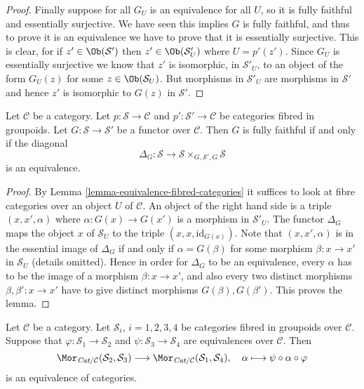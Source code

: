 \begin{proof}
\medskip\noindent
Finally suppose for all $G_U$ is an equivalence for all $U$, so it is
fully faithful and essentially surjective.  We have seen this implies $G$ is
fully faithful, and thus to prove it is an equivalence we have to prove that
it is essentially surjective.  This is clear, for if $z'\in
\Ob(\mathcal{S}')$ then $z'\in \Ob(\mathcal{S}'_U)$ where
$U = p'(z')$.  Since $G_U$ is essentially surjective we know that
$z'$ is isomorphic, in $\mathcal{S}'_U$, to an object of the form
$G_U(z)$ for some $z\in \Ob(\mathcal{S}_U)$.  But morphisms
in $\mathcal{S}'_U$ are morphisms in $\mathcal{S}'$ and hence $z'$ is
isomorphic to $G(z)$ in $\mathcal{S}'$.
\end{proof}

\begin{lemma}
\label{lemma-fully-faithful-diagonal-equivalence}
Let $\mathcal{C}$ be a category. Let $p : \mathcal{S}\to \mathcal{C}$ and
$p' : \mathcal{S'}\to \mathcal{C}$ be categories fibred in groupoids.
Let $G : \mathcal{S}\to \mathcal {S}'$ be a functor over $\mathcal{C}$.
Then $G$ is fully faithful if and only if the diagonal
$$
\Delta_G :
\mathcal{S}
\longrightarrow
\mathcal{S} \times_{G, \mathcal{S}', G} \mathcal{S}
$$
is an equivalence.
\end{lemma}

\begin{proof}
By
Lemma \ref{lemma-equivalence-fibred-categories}
it suffices to look at fibre categories over an object $U$ of $\mathcal{C}$.
An object of the right hand side is a triple $(x, x', \alpha)$ where
$\alpha : G(x) \to G(x')$ is a morphism in $\mathcal{S}'_U$.
The functor $\Delta_G$ maps the object $x$ of $\mathcal{S}_U$
to the triple $(x, x, \text{id}_{G(x)})$. Note that $(x, x', \alpha)$
is in the essential image of $\Delta_G$ if and only if $\alpha = G(\beta)$
for some morphism $\beta : x \to x'$ in $\mathcal{S}_U$ (details omitted).
Hence in order for $\Delta_G$ to be an equivalence, every $\alpha$ has to
be the image of a morphism $\beta : x \to x'$, and also every two
distinct morphisms $\beta, \beta' : x \to x'$ have to give distinct
morphisms $G(\beta), G(\beta')$. This proves the lemma.
\end{proof}

\begin{lemma}
\label{lemma-morphisms-equivalent-fibred-groupoids}
Let $\mathcal{C}$ be a category.
Let $\mathcal{S}_i$, $i = 1, 2, 3, 4$ be categories fibred in
groupoids over $\mathcal{C}$.
Suppose that $\varphi : \mathcal{S}_1 \to \mathcal{S}_2$ and
$\psi : \mathcal{S}_3 \to \mathcal{S}_4$ are equivalences
over $\mathcal{C}$. Then
$$
\Mor_{\textit{Cat}/\mathcal{C}}(\mathcal{S}_2, \mathcal{S}_3)
\longrightarrow
\Mor_{\textit{Cat}/\mathcal{C}}(\mathcal{S}_1, \mathcal{S}_4),
\quad \alpha \longmapsto \psi \circ \alpha \circ \varphi
$$
is an equivalence of categories.
\end{lemma}

